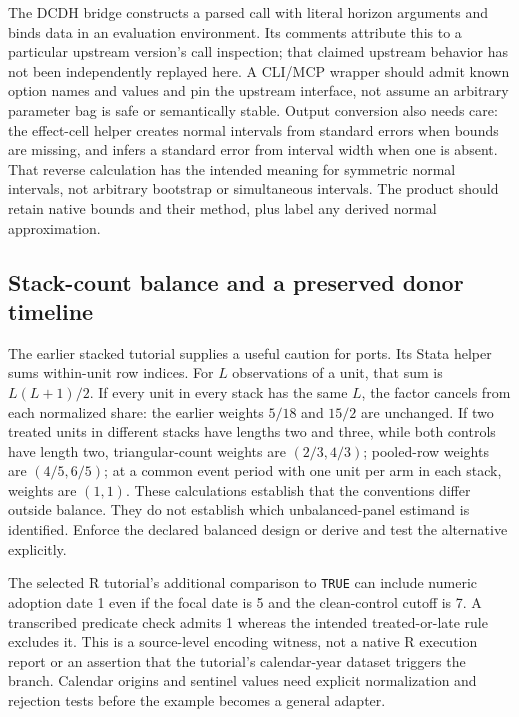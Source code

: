 The DCDH bridge constructs a parsed call with literal horizon arguments and binds data in an evaluation environment. Its
comments attribute this to a particular upstream version's call inspection; that claimed upstream behavior has not been
independently replayed here. A CLI/MCP wrapper should admit known option names and values and pin the upstream interface,
not assume an arbitrary parameter bag is safe or semantically stable. Output conversion also needs care: the effect-cell
helper creates normal intervals from standard errors when bounds are missing, and infers a standard error from interval
width when one is absent. That reverse calculation has the intended meaning for symmetric normal intervals, not arbitrary
bootstrap or simultaneous intervals. The product should retain native bounds and their method, plus label any derived
normal approximation.~\citep{exec28_panel_delegates}

\subsection{Stack-count balance and a preserved donor timeline}

The earlier stacked tutorial supplies a useful caution for ports. Its Stata helper sums within-unit row indices. For
$L$ observations of a unit, that sum is $L(L+1)/2$. If every unit in every stack has the same $L$, the factor cancels
from each normalized share: the earlier weights $5/18$ and $15/2$ are unchanged. If two treated units in different stacks
have lengths two and three, while both controls have length two, triangular-count weights are $(2/3,4/3)$; pooled-row
weights are $(4/5,6/5)$; at a common event period with one unit per arm in each stack, weights are $(1,1)$.
These calculations establish that the conventions differ outside balance. They do not establish which unbalanced-panel
estimand is identified. Enforce the declared balanced design or derive and test the alternative explicitly.
\citep{exec28_panel_delegate_reference}

The selected R tutorial's additional comparison to \texttt{TRUE} can include numeric adoption date 1 even if the focal
date is 5 and the clean-control cutoff is 7. A transcribed predicate check admits 1 whereas the intended treated-or-late
rule excludes it. This is a source-level encoding witness, not a native R execution report or an assertion that the
tutorial's calendar-year dataset triggers the branch. Calendar origins and sentinel values need explicit normalization
and rejection tests before the example becomes a general adapter.~\citep{exec28_panel_delegate_reference}

